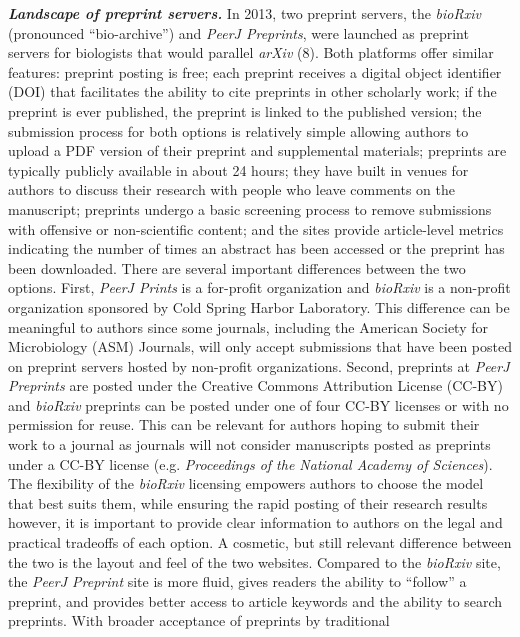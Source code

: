 \documentclass[11pt,]{article}
\begin{document}
\textbf{\emph{Landscape of preprint servers.}} In 2013, two preprint
servers, the \emph{bioRxiv} (pronounced ``bio-archive'') and \emph{PeerJ
Preprints}, were launched as preprint servers for biologists that would
parallel \emph{arXiv} (8). Both platforms offer similar features:
preprint posting is free; each preprint receives a digital object
identifier (DOI) that facilitates the ability to cite preprints in other
scholarly work; if the preprint is ever published, the preprint is
linked to the published version; the submission process for both options
is relatively simple allowing authors to upload a PDF version of their
preprint and supplemental materials; preprints are typically publicly
available in about 24 hours; they have built in venues for authors to
discuss their research with people who leave comments on the manuscript;
preprints undergo a basic screening process to remove submissions with
offensive or non-scientific content; and the sites provide article-level
metrics indicating the number of times an abstract has been accessed or
the preprint has been downloaded. There are several important
differences between the two options. First, \emph{PeerJ Prints} is a
for-profit organization and \emph{bioRxiv} is a non-profit organization
sponsored by Cold Spring Harbor Laboratory. This difference can be
meaningful to authors since some journals, including the American
Society for Microbiology (ASM) Journals, will only accept submissions
that have been posted on preprint servers hosted by non-profit
organizations. Second, preprints at \emph{PeerJ Preprints} are posted
under the Creative Commons Attribution License (CC-BY) and
\emph{bioRxiv} preprints can be posted under one of four CC-BY licenses
or with no permission for reuse. This can be relevant for authors hoping
to submit their work to a journal as journals will not consider
manuscripts posted as preprints under a CC-BY license (e.g.
\emph{Proceedings of the National Academy of Sciences}). The flexibility
of the \emph{bioRxiv} licensing empowers authors to choose the model
that best suits them, while ensuring the rapid posting of their research
results however, it is important to provide clear information to authors
on the legal and practical tradeoffs of each option. A cosmetic, but
still relevant difference between the two is the layout and feel of the
two websites. Compared to the \emph{bioRxiv} site, the \emph{PeerJ
Preprint} site is more fluid, gives readers the ability to ``follow'' a
preprint, and provides better access to article keywords and the ability
to search preprints. With broader acceptance of preprints by traditional
\end{document}
